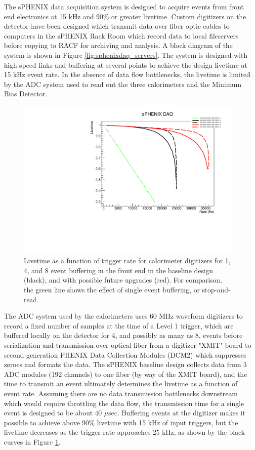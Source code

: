 The sPHENIX data acquisition system is designed to acquire events from
front end electronics at 15 kHz and 90\% or greater livetime.
Custom digitizers on the detector have been designed which transmit data over fiber optic cables to computers in the sPHENIX Rack Room which record data to local
fileservers before copying to RACF for archiving and analysis.
A block diagram of the system is shown in Figure \ref{fig:sphenixdaq_servers}.
The system is designed with high speed links and buffering at several points to
achieve the design livetime at 15 kHz event rate.
In the absence of data flow bottlenecks, the livetime is limited by the
ADC system used to read out the three calorimeters and the Minimum Bias Detector.

\begin{figure}
    \centering
    \includegraphics[width=0.55\linewidth]{figs/sphenix_daqrate_3.pdf}
    \caption{Livetime as a function of trigger rate for calorimeter digitizers for
    1, 4, and 8 event buffering in the front end in the baseline design (black),
    and with possible future upgrades (red).  For comparison, the green line shows the effect of single event buffering, or stop-and-read.}
    \label{fig:sphenix_daqrate}
\end{figure}

The ADC system used by the calorimeters uses 60 MHz waveform digitizers
to record a fixed number of samples at the time of a Level 1 trigger, 
which are buffered locally on the detector for 4, and possibly as many as 8,
events before serialization and transmission over optical fiber from a digitizer "XMIT" board to
second generation PHENIX Data Collection Modules (DCM2) which suppresses zeroes
and formats the data.
The sPHENIX baseline design collects data from 3 ADC modules  (192 channels) to one fiber (by way of the XMIT board), and the time to transmit an event ultimately determines the livetime as a function of event rate.
Assuming there are no data transmission bottlenecks downstream 
which would require throttling the data flow, the transmission time for a single
event is designed to be about 40 $\mu$sec.  
Buffering events at the digitizer makes it possible to achieve above 90\% livetime 
with 15 kHz of input triggers, but the livetime decreases as the trigger
rate approaches 25 kHz, as shown by the black curves in Figure \ref{fig:sphenix_daqrate}.

